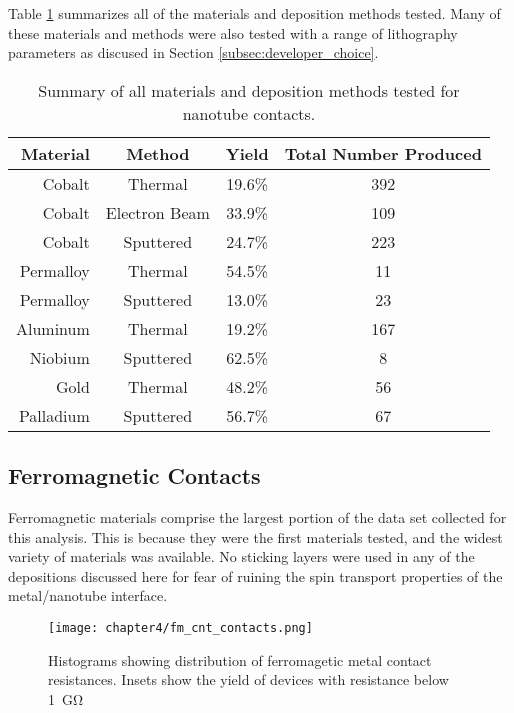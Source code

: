 Table \ref{table:all_contact_results} summarizes all of the materials and deposition methods tested. Many of these materials and methods were also tested with a range of lithography parameters as discused in Section \ref{subsec:developer_choice}. 

\begin{table}
    \centering
    \caption{Summary of all materials and deposition methods tested for nanotube contacts.}
    \begin{tabular}{ r | c c c}
        Material & Method & Yield & Total Number Produced \\ \hline
        Cobalt & Thermal & 19.6\% & 392 \\ 
        Cobalt & Electron Beam & 33.9\% & 109 \\ 
        Cobalt & Sputtered & 24.7\% & 223 \\ 
        Permalloy & Thermal & 54.5\% & 11 \\
        Permalloy & Sputtered & 13.0\% & 23 \\
        Aluminum & Thermal & 19.2\% & 167 \\
        Niobium & Sputtered & 62.5\% & 8 \\
        Gold & Thermal & 48.2\% & 56 \\
        Palladium & Sputtered & 56.7\% & 67
    \end{tabular}
    \label{table:all_contact_results}  
\end{table}

\subsection{Ferromagnetic Contacts}

Ferromagnetic materials comprise the largest portion of the data set collected for this analysis. This is because they were the first materials tested, and the widest variety of materials was available. No sticking layers were used in any of the depositions discussed here for fear of ruining the spin transport properties of the metal/nanotube interface.

\begin{figure}
    \centering
    \texttt{[image: chapter4/fm\_cnt\_contacts.png]}
    \caption{Histograms showing distribution of ferromagetic metal contact resistances. Insets show the yield of devices with resistance below \SI{1}{\giga\ohm}}
    \label{fig:fm_contacts}
\end{figure}

